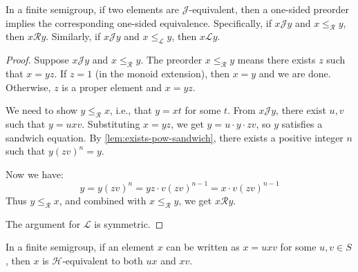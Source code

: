 \begin{lemma}
\label{lem:j-strengthening}
In a finite semigroup, if two elements are $\mathcal{J}$-equivalent, then a one-sided preorder implies the corresponding one-sided equivalence. Specifically, if $x \mathcal{J} y$ and $x \leq_{\mathcal{R}} y$, then $x \mathcal{R} y$. Similarly, if $x \mathcal{J} y$ and $x \leq_{\mathcal{L}} y$, then $x \mathcal{L} y$.
\leanok
{}
\end{lemma}

\begin{proof}
\leanok
Suppose $x \mathcal{J} y$ and $x \leq_{\mathcal{R}} y$. The preorder $x \leq_{\mathcal{R}} y$ means there exists $z$ such that $x = yz$. If $z = 1$ (in the monoid extension), then $x = y$ and we are done. Otherwise, $z$ is a proper element and $x = yz$.

We need to show $y \leq_{\mathcal{R}} x$, i.e., that $y = xt$ for some $t$. From $x \mathcal{J} y$, there exist $u, v$ such that $y = uxv$. Substituting $x = yz$, we get $y = u \cdot y \cdot zv$, so $y$ satisfies a sandwich equation. By \ref{lem:exists-pow-sandwich}, there exists a positive integer $n$ such that $y(zv)^n = y$.

Now we have:
\[
y = y(zv)^n = yz \cdot v(zv)^{n-1} = x \cdot v(zv)^{n-1}
\]
Thus $y \leq_{\mathcal{R}} x$, and combined with $x \leq_{\mathcal{R}} y$, we get $x \mathcal{R} y$.

The argument for $\mathcal{L}$ is symmetric.
\end{proof}

\begin{lemma}
\label{lem:h-of-sandwich}
In a finite semigroup, if an element $x$ can be written as $x = uxv$ for some $u, v \in S$, then $x$ is $\mathcal{H}$-equivalent to both $ux$ and $xv$.
\leanok
{}
\end{lemma}

